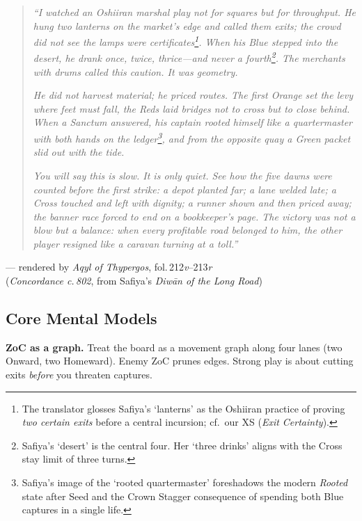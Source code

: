 \documentclass[11pt]{article}
\begin{document}
\vspace{-0.5em}
\begin{quote}\small
\textit{“I watched an Oshiiran marshal play not for squares but for \emph{throughput}. He hung two lanterns on the market’s edge and called them exits; the crowd did not see the lamps were \emph{certificates}\footnote{The translator glosses Safiya’s ‘lanterns’ as the Oshiiran practice of proving \emph{two certain exits} before a central incursion; cf.\ our XS (\emph{Exit Certainty}).}. When his Blue stepped into the desert, he drank once, twice, thrice—and never a fourth\footnote{Safiya’s ‘desert’ is the central four. Her ‘three drinks’ aligns with the Cross stay limit of three turns.}. The merchants with drums called this caution. It was geometry.}

\textit{He did not harvest material; he priced routes. The first Orange set the levy where feet must fall, the Reds laid bridges \emph{not} to cross but to \emph{close} behind. When a Sanctum answered, his captain rooted himself like a quartermaster with both hands on the ledger\footnote{Safiya’s image of the ‘rooted quartermaster’ foreshadows the modern \emph{Rooted} state after Seed and the Crown Stagger consequence of spending both Blue captures in a single life.}, and from the opposite quay a Green packet slid out with the tide.}

\textit{You will say this is slow. It is only quiet. See how the five dawns were counted before the first strike: a depot planted far; a lane welded late; a Cross touched and left with dignity; a runner shown and then priced away; the banner race forced to end on a bookkeeper’s page. The victory was not a blow but a balance: when every profitable road belonged to him, the other player resigned like a caravan turning at a toll.”}
\end{quote}
\begin{flushright}\small
— rendered by \textit{Aqyl of Thypergos}, fol.\,212\textit{v}–213\textit{r}\\
(\textit{Concordance c.\,802}, from Safiya’s \emph{Diwān of the Long Road})
\end{flushright}

\subsection*{Core Mental Models}
\textbf{ZoC as a graph.} Treat the board as a movement graph along four lanes (two Onward, two Homeward). Enemy ZoC prunes edges. Strong play is about cutting exits \emph{before} you threaten captures.
\end{document}
